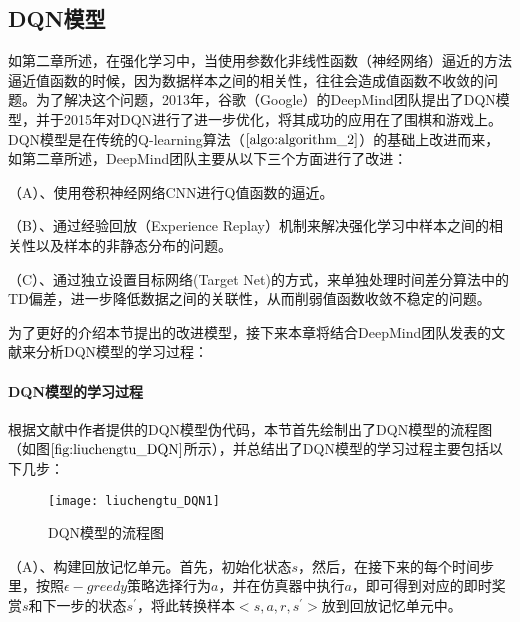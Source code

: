 \subsection{DQN模型}
如第二章所述，在强化学习中，当使用参数化非线性函数（神经网络）逼近的方法逼近值函数的时候，因为数据样本之间的相关性，往往会造成值函数不收敛的问题。为了解决这个问题，2013年，谷歌（Google）的DeepMind团队提出了DQN模型，并于2015年对DQN进行了进一步优化，将其成功的应用在了围棋和游戏上。DQN模型是在传统的Q-learning算法（$\ref{algo:algorithm_2}$）的基础上改进而来，如第二章所述，DeepMind团队主要从以下三个方面进行了改进：

（A）、使用卷积神经网络CNN进行Q值函数的逼近。

（B）、通过经验回放（Experience Replay）机制来解决强化学习中样本之间的相关性以及样本的非静态分布的问题。

（C）、通过独立设置目标网络(Target Net)的方式，来单独处理时间差分算法中的TD偏差，进一步降低数据之间的关联性，从而削弱值函数收敛不稳定的问题。

 为了更好的介绍本节提出的改进模型，接下来本章将结合DeepMind团队发表的文献\citep{mnih2013playing,mnih2015human}来分析DQN模型的学习过程：

\paragraph{DQN模型的学习过程}
根据文献\citep{mnih2015human}中作者提供的DQN模型伪代码，本节首先绘制出了DQN模型的流程图（如图$\ref{fig:liuchengtu_DQN}$所示），并总结出了DQN模型的学习过程主要包括以下几步：

\begin{figure}[htbp]
\centering
\texttt{[image: liuchengtu\_DQN1]}
\caption{DQN模型的流程图}
\label{fig:liuchengtu_DQN}
\end{figure}
 
（A）、构建回放记忆单元。首先，初始化状态$s$，然后，在接下来的每个时间步里，按照$\epsilon-greedy$策略选择行为$a$，并在仿真器中执行$a$，即可得到对应的即时奖赏$s$和下一步的状态$s^{'}$，将此转换样本$<s, a, r, s^{'}>$放到回放记忆单元中。

